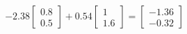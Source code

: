 \documentclass[preview]{standalone}
\begin{document}
\begin{align*}
-2.38 \begin{bmatrix} 0.8 \\ 0.5 \end{bmatrix} + 0.54 \begin{bmatrix} 1 \\ 1.6 \end{bmatrix} = \begin{bmatrix} -1.36 \\ -0.32 \end{bmatrix}
\end{align*}
\end{document}
